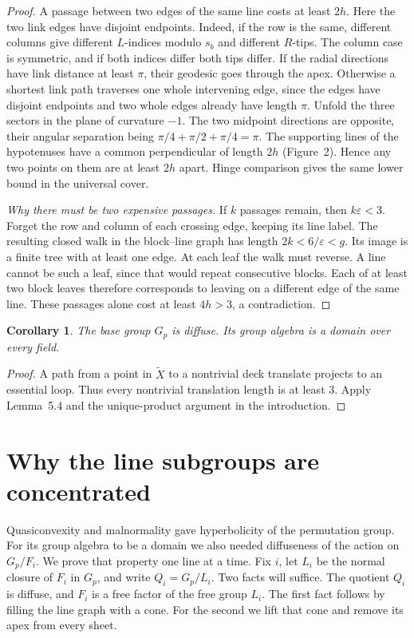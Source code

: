 \documentclass[11pt,a4paper]{article}
\newtheorem{corollary}[theorem]{Corollary}
\numberwithin{equation}{section}
\begin{document}
\begin{proof}
A passage between two edges of the same line costs at least \(2h\). Here the two link edges have disjoint endpoints. Indeed, if the row is the same, different columns give different \(L\)-indices modulo \(s_b\) and different \(R\)-tips. The column case is symmetric, and if both indices differ both tips differ. If the radial directions have link distance at least \(\pi\), their geodesic goes through the apex. Otherwise a shortest link path traverses one whole intervening edge, since the edges have disjoint endpoints and two whole edges already have length \(\pi\). Unfold the three sectors in the plane of curvature \(-1\). The two midpoint directions are opposite, their angular separation being \(\pi/4+\pi/2+\pi/4=\pi\). The supporting lines of the hypotenuses have a common perpendicular of length \(2h\) (Figure~2). Hence any two points on them are at least \(2h\) apart. Hinge comparison gives the same lower bound in the universal cover.

\emph{Why there must be two expensive passages.} If \(k\) passages remain, then \(k\varepsilon<3\). Forget the row and column of each crossing edge, keeping its line label. The resulting closed walk in the block--line graph has length \(2k<6/\varepsilon<g\). Its image is a finite tree with at least one edge. At each leaf the walk must reverse. A line cannot be such a leaf, since that would repeat consecutive blocks. Each of at least two block leaves therefore corresponds to leaving on a different edge of the same line. These passages alone cost at least \(4h>3\), a contradiction.
\end{proof}

\begin{corollary}
The base group \(G_p\) is diffuse. Its group algebra is a domain over every field.
\end{corollary}

\begin{proof}
A path from a point in \(\widetilde X\) to a nontrivial deck translate projects to an essential loop. Thus every nontrivial translation length is at least \(3\). Apply Lemma~5.4 and the unique-product argument in the introduction.
\end{proof}

\section{Why the line subgroups are concentrated}

Quasiconvexity and malnormality gave hyperbolicity of the permutation group.
For its group algebra to be a domain we also needed diffuseness of the action
on $G_p/F_i$. We prove that property one line at a time. Fix $i$, let $L_i$
be the normal closure of $F_i$ in $G_p$, and write $Q_i=G_p/L_i$. Two facts
will suffice. The quotient $Q_i$ is diffuse, and $F_i$ is a free factor of the
free group $L_i$. The first fact follows by filling the line graph with a cone.
For the second we lift that cone and remove its apex from every sheet.
\end{document}
